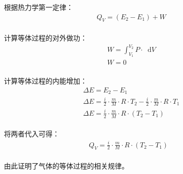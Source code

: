 \documentclass[UTF8]{ctexart}
\newcommand*{\dif}{\mathop{}\!\mathrm{d}}
\begin{document}
\newpage

    根据热力学第一定律：
    \begin{align}
        &Q_V=(E_2-E_1)+W
    \end{align}\\
    计算等体过程的对外做功：
    \begin{align}
        &W=\int_{V_1}^{V_2} P\cdot\dif V\\[4mm]
        &W=0
    \end{align}\\
    计算等体过程的内能增加：
    \begin{align}
        &\Delta E=E_2-E_1\\[4mm]
        &\Delta E=\frac{i}{2}\cdot\frac{m}{M}\cdot R\cdot T_2-\frac{i}{2}\cdot\frac{m}{M}\cdot R\cdot T_1\\[4mm]
        &\Delta E=\frac{i}{2}\cdot\frac{m}{M}\cdot R\cdot (T_2-T_1)
    \end{align}\\
    将两者代入可得：
    \begin{align}
        Q_V=\frac{i}{2}\cdot\frac{m}{M}\cdot R\cdot (T_2-T_1)
    \end{align}\\
    由此证明了气体的等体过程的相关规律。

\newpage
\end{document}
